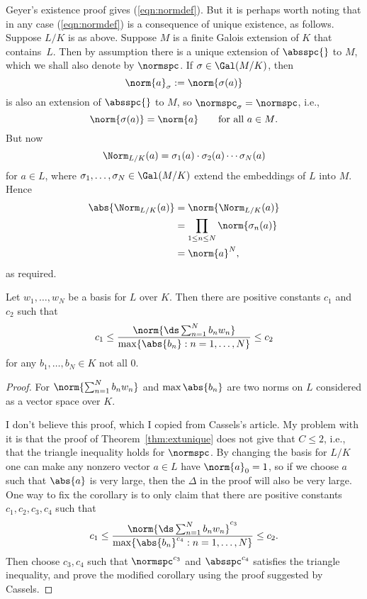 \documentclass[11pt]{book}
\begin{document}
\begin{ch}
\begin{remark}
  Geyer's existence proof gives (\ref{eqn:normdef}).  But it is
  perhaps worth noting that in any case (\ref{eqn:normdef}) is a
  consequence of unique existence, as follows.  Suppose $L/K$ is as
  above.  Suppose $M$ is a finite Galois extension of $K$ that
  contains~$L$.  Then by assumption there is a unique extension of
  $\absspc{}$ to $M$, which we shall also denote by $\normspc$.  If
  $\sigma\in\Gal(M/K)$, then
$$\norm{a}_\sigma := \norm{\sigma(a)}
$$
is also an extension of $\absspc{}$ to $M$, so $\normspc_\sigma = \normspc$,
i.e.,
$$
  \norm{\sigma(a)} = \norm{a}\qquad\text{for all $a\in M$}.
$$
But now
$$
\Norm_{L/K}(a) = \sigma_1(a) \cdot \sigma_2(a) \cdots \sigma_N(a)
$$
for $a\in L$, where $\sigma_1,\ldots, \sigma_N\in \Gal(M/K)$ extend the embeddings
of $L$ into $M$.
Hence
\begin{align*}
 \abs{\Norm_{L/K}(a)} &= \norm{\Norm_{L/K}(a)} \\
     &= \prod_{1\leq n \leq N} \norm{\sigma_n(a)}\\
     &= \norm{a}^N,
\end{align*}
as required.
\end{remark}

\begin{corollary}
Let $w_1,\ldots, w_N$ be a basis for $L$ over $K$.  Then
there are positive constants $c_1$ and $c_2$ such that
$$
   c_1 \leq \frac{\norm{\ds\sum_{n=1}^{N} b_n w_n}}{\max \{ \abs{b_n} : n = 1,\ldots, N\}} \leq c_2
$$
for any $b_1,\ldots, b_N\in K$ not all $0$.
\end{corollary}
\begin{proof}
  For $\norm{\sum_{n=1}^N b_n w_n}$ and $\max{\abs{b_n}}$ are two norms
  on $L$ considered as a vector space over $K$.

I don't believe this
  proof, which I copied from Cassels's article.  My problem with it is
  that the proof of Theorem~\ref{thm:extunique} does not give that
  $C\leq 2$, i.e., that the triangle inequality holds for $\normspc$.  By
changing the basis for $L/K$ one can make any nonzero vector $a\in L$
have $\norm{a}_0=1$, so if we choose $a$ such that $\abs{a}$ is very large,
then the $\Delta$ in the proof will also be very large.  One way to fix
the corollary is to only claim that there are positive
constants $c_1, c_2,c_3, c_4$
such that
$$
   c_1 \leq \frac{\norm{\ds\sum_{n=1}^{N} b_n w_n}^{c_3}}{\max \{ \abs{b_n}^{c_4} : n = 1,\ldots, N\}} \leq c_2.
$$
Then choose $c_3, c_4$ such that $\normspc^{c_3}$ and $\absspc^{c_4}$ satisfies the triangle inequality, and prove the modified corollary
using the proof suggested by Cassels.
\end{proof}


\end{ch}
\end{document}
